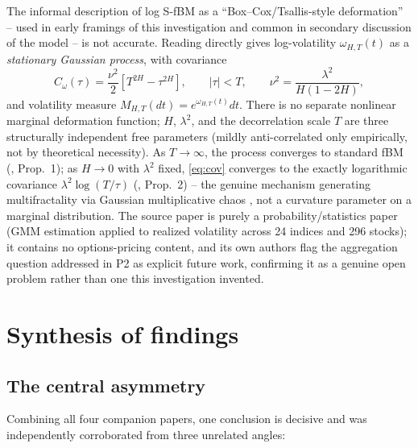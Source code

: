 \documentclass[11pt]{article}
\begin{document}
The informal description of log S-fBM as a ``Box--Cox/Tsallis-style deformation'' -- used in early framings of this investigation and common in secondary discussion of the model -- is not accurate. Reading \citet{wu2022rough} directly gives log-volatility $\omega_{H,T}(t)$ as a \emph{stationary Gaussian process}, with covariance
\begin{equation}
C_\omega(\tau) = \frac{\nu^2}{2}\left[T^{2H}-\tau^{2H}\right], \qquad |\tau|<T, \qquad \nu^2 = \frac{\lambda^2}{H(1-2H)}, \label{eq:cov}
\end{equation}
and volatility measure $M_{H,T}(dt)=e^{\omega_{H,T}(t)}dt$. There is no separate nonlinear marginal deformation function; $H$, $\lambda^2$, and the decorrelation scale $T$ are three structurally independent free parameters (mildly anti-correlated only empirically, not by theoretical necessity). As $T\to\infty$, the process converges to standard fBM (\citealp{wu2022rough}, Prop.~1); as $H\to0$ with $\lambda^2$ fixed, \eqref{eq:cov} converges to the exactly logarithmic covariance $\lambda^2\log(T/\tau)$ (\citealp{wu2022rough}, Prop.~2) -- the genuine mechanism generating multifractality via Gaussian multiplicative chaos \citep{kahane1985chaos}, not a curvature parameter on a marginal distribution. The source paper is purely a probability/statistics paper (GMM estimation applied to realized volatility across 24 indices and 296 stocks); it contains no options-pricing content, and its own authors flag the aggregation question addressed in P2 as explicit future work, confirming it as a genuine open problem rather than one this investigation invented.

\section{Synthesis of findings}

\subsection{The central asymmetry}

Combining all four companion papers, one conclusion is decisive and was independently corroborated from three unrelated angles:
\end{document}
